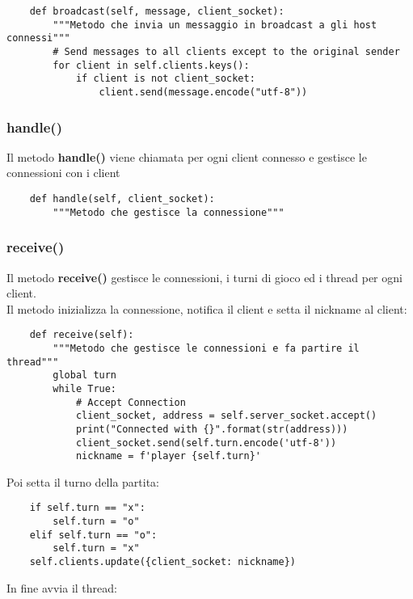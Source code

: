 \documentclass{article}
\begin{document}
\begin{verbatim}
    def broadcast(self, message, client_socket):
        """Metodo che invia un messaggio in broadcast a gli host connessi"""
        # Send messages to all clients except to the original sender
        for client in self.clients.keys():
            if client is not client_socket:
                client.send(message.encode("utf-8"))
\end{verbatim}

\subsubsection{handle()}
Il metodo \textbf{handle()} viene chiamata per ogni client connesso e gestisce le connessioni 
con i client

\begin{verbatim}
    def handle(self, client_socket):
        """Metodo che gestisce la connessione"""
\end{verbatim}

\subsubsection{receive()}
Il metodo \textbf{receive()} gestisce le connessioni, i turni di gioco ed i thread per ogni client.\\

Il metodo inizializza la connessione, notifica il client e setta il nickname al client:

\begin{verbatim}
    def receive(self):
        """Metodo che gestisce le connessioni e fa partire il thread"""
        global turn
        while True:
            # Accept Connection
            client_socket, address = self.server_socket.accept()
            print("Connected with {}".format(str(address)))
            client_socket.send(self.turn.encode('utf-8'))
            nickname = f'player {self.turn}'
\end{verbatim}

Poi setta il turno della partita:

\begin{verbatim}
    if self.turn == "x":
        self.turn = "o"
    elif self.turn == "o":
        self.turn = "x"
    self.clients.update({client_socket: nickname})
\end{verbatim}

In fine avvia il thread:
\end{document}
